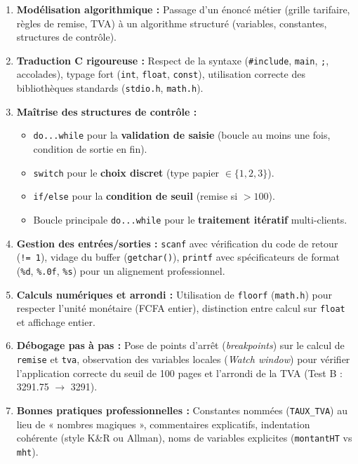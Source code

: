 \documentclass[11pt]{article}
\begin{document}
\begin{aretenir}
\begin{enumerate}
    \item \textbf{Modélisation algorithmique :} Passage d'un énoncé métier (grille tarifaire, règles de remise, TVA) à un algorithme structuré (variables, constantes, structures de contrôle).
    \item \textbf{Traduction C rigoureuse :} Respect de la syntaxe (\texttt{\#include}, \texttt{main}, \texttt{;}, accolades), typage fort (\texttt{int}, \texttt{float}, \texttt{const}), utilisation correcte des bibliothèques standards (\texttt{stdio.h}, \texttt{math.h}).
    \item \textbf{Maîtrise des structures de contrôle :}
    \begin{itemize}
        \item \texttt{do...while} pour la \textbf{validation de saisie} (boucle au moins une fois, condition de sortie en fin).
        \item \texttt{switch} pour le \textbf{choix discret} (type papier $\in \{1,2,3\}$).
        \item \texttt{if/else} pour la \textbf{condition de seuil} (remise si $> 100$).
        \item Boucle principale \texttt{do...while} pour le \textbf{traitement itératif} multi-clients.
    \end{itemize}
    \item \textbf{Gestion des entrées/sorties :} \texttt{scanf} avec vérification du code de retour (\texttt{!= 1}), vidage du buffer (\texttt{getchar()}), \texttt{printf} avec spécificateurs de format (\texttt{\%d}, \texttt{\%.0f}, \texttt{\%s}) pour un alignement professionnel.
    \item \textbf{Calculs numériques et arrondi :} Utilisation de \texttt{floorf} (\texttt{math.h}) pour respecter l'unité monétaire (FCFA entier), distinction entre calcul sur \texttt{float} et affichage entier.
    \item \textbf{Débogage pas à pas :} Pose de points d'arrêt (\textit{breakpoints}) sur le calcul de \texttt{remise} et \texttt{tva}, observation des variables locales (\textit{Watch window}) pour vérifier l'application correcte du seuil de 100 pages et l'arrondi de la TVA (Test B : 3291.75 $\rightarrow$ 3291).
    \item \textbf{Bonnes pratiques professionnelles :} Constantes nommées (\texttt{TAUX\_TVA}) au lieu de « nombres magiques », commentaires explicatifs, indentation cohérente (style K\&R ou Allman), noms de variables explicites (\texttt{montantHT} vs \texttt{mht}).
\end{enumerate}
\end{aretenir}
\end{document}
